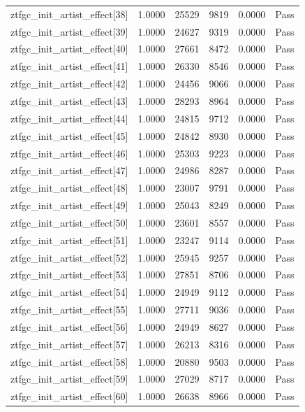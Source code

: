 \begin{table}[htbp]
\begin{tabular}{llrrll}
ztfgc\_init\_artist\_effect[38] & 1.0000 & 25529 & 9819 & 0.0000 & Pass \\
ztfgc\_init\_artist\_effect[39] & 1.0000 & 24627 & 9319 & 0.0000 & Pass \\
ztfgc\_init\_artist\_effect[40] & 1.0000 & 27661 & 8472 & 0.0000 & Pass \\
ztfgc\_init\_artist\_effect[41] & 1.0000 & 26330 & 8546 & 0.0000 & Pass \\
ztfgc\_init\_artist\_effect[42] & 1.0000 & 24456 & 9066 & 0.0000 & Pass \\
ztfgc\_init\_artist\_effect[43] & 1.0000 & 28293 & 8964 & 0.0000 & Pass \\
ztfgc\_init\_artist\_effect[44] & 1.0000 & 24815 & 9712 & 0.0000 & Pass \\
ztfgc\_init\_artist\_effect[45] & 1.0000 & 24842 & 8930 & 0.0000 & Pass \\
ztfgc\_init\_artist\_effect[46] & 1.0000 & 25303 & 9223 & 0.0000 & Pass \\
ztfgc\_init\_artist\_effect[47] & 1.0000 & 24986 & 8287 & 0.0000 & Pass \\
ztfgc\_init\_artist\_effect[48] & 1.0000 & 23007 & 9791 & 0.0000 & Pass \\
ztfgc\_init\_artist\_effect[49] & 1.0000 & 25043 & 8249 & 0.0000 & Pass \\
ztfgc\_init\_artist\_effect[50] & 1.0000 & 23601 & 8557 & 0.0000 & Pass \\
ztfgc\_init\_artist\_effect[51] & 1.0000 & 23247 & 9114 & 0.0000 & Pass \\
ztfgc\_init\_artist\_effect[52] & 1.0000 & 25945 & 9257 & 0.0000 & Pass \\
ztfgc\_init\_artist\_effect[53] & 1.0000 & 27851 & 8706 & 0.0000 & Pass \\
ztfgc\_init\_artist\_effect[54] & 1.0000 & 24949 & 9112 & 0.0000 & Pass \\
ztfgc\_init\_artist\_effect[55] & 1.0000 & 27711 & 9036 & 0.0000 & Pass \\
ztfgc\_init\_artist\_effect[56] & 1.0000 & 24949 & 8627 & 0.0000 & Pass \\
ztfgc\_init\_artist\_effect[57] & 1.0000 & 26213 & 8316 & 0.0000 & Pass \\
ztfgc\_init\_artist\_effect[58] & 1.0000 & 20880 & 9503 & 0.0000 & Pass \\
ztfgc\_init\_artist\_effect[59] & 1.0000 & 27029 & 8717 & 0.0000 & Pass \\
ztfgc\_init\_artist\_effect[60] & 1.0000 & 26638 & 8966 & 0.0000 & Pass \\

\end{tabular}
\end{table}
